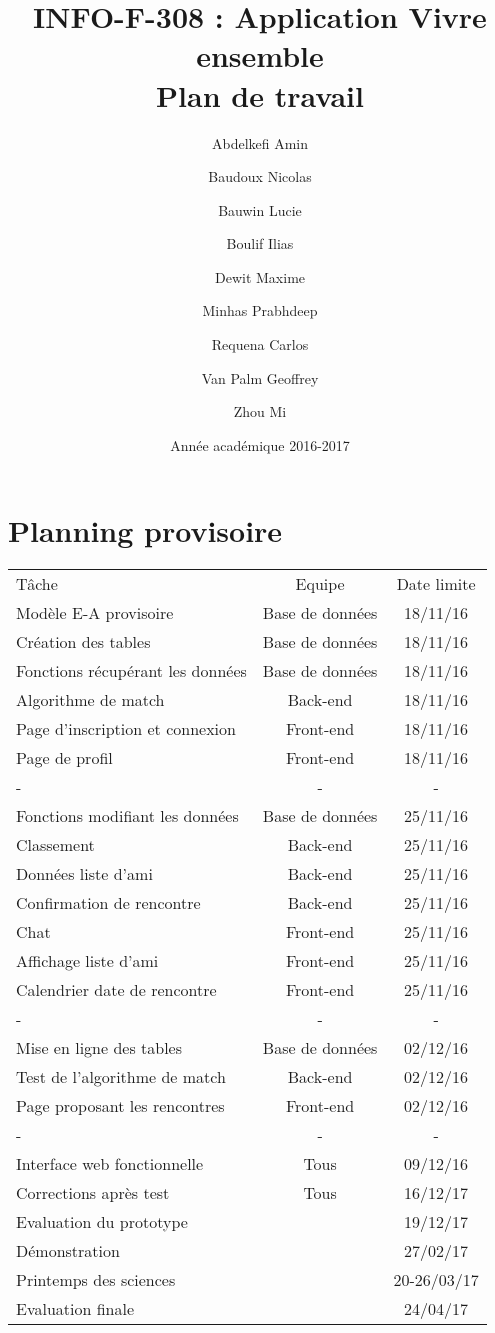 \documentclass[10pt]{article}
\title{INFO-F-308 : Application Vivre ensemble \\ Plan de travail}
\author{Abdelkefi Amin \and Baudoux Nicolas \and Bauwin Lucie \and Boulif Ilias \and Dewit Maxime \and  Minhas Prabhdeep \and Requena Carlos \and Van Palm Geoffrey \and Zhou Mi}
\date{Année académique 2016-2017}
\begin{document}
 \maketitle
 \newpage
 \section{Planning provisoire}
  \begin{center}
  \begin{tabular}{ l | c | c }
   Tâche & Equipe & Date limite \\
   Modèle E-A provisoire & Base de données & 18/11/16\\ %
   Création des tables & Base de données & 18/11/16\\
   Fonctions récupérant les données & Base de données & 18/11/16\\
   Algorithme de match & Back-end & 18/11/16\\
   Page d'inscription et connexion & Front-end & 18/11/16\\
   Page de profil & Front-end & 18/11/16\\
   - & - & -\\
   Fonctions modifiant les données & Base de données & 25/11/16\\
   Classement & Back-end & 25/11/16\\
   Données liste d'ami & Back-end & 25/11/16\\
   Confirmation de rencontre & Back-end & 25/11/16\\
   Chat & Front-end & 25/11/16\\
   Affichage liste d'ami & Front-end & 25/11/16\\
   Calendrier date de rencontre & Front-end & 25/11/16\\
   - & - & -\\
   Mise en ligne des tables & Base de données & 02/12/16\\
   Test de l'algorithme de match & Back-end & 02/12/16\\
   Page proposant les rencontres & Front-end & 02/12/16\\
   - & - & -\\
   Interface web fonctionnelle & Tous & 09/12/16\\
   Corrections après test & Tous & 16/12/17\\
   Evaluation du prototype & & 19/12/17\\
   Démonstration & & 27/02/17\\
   Printemps des sciences & & 20-26/03/17\\
   Evaluation finale & & 24/04/17\\
  \end{tabular}
  \end{center}
\end{document}
